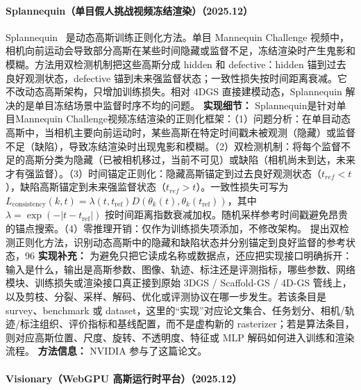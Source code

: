 \paragraph{Splannequin（单目假人挑战视频冻结渲染）（2025.12）}
Splannequin~\cite{2512_05113} 是动态高斯训练正则化方法。单目 Mannequin Challenge 视频中，相机向前运动会导致部分高斯在某些时间隐藏或监督不足，冻结渲染时产生鬼影和模糊。方法用双检测机制把这些高斯分成 hidden 和 defective：hidden 锚到过去良好观测状态，defective 锚到未来强监督状态；一致性损失按时间距离衰减。它不改动态高斯架构，只增加训练损失。相对 4DGS 直接建模动态，Splannequin 解决的是单目冻结场景中监督时序不均的问题。
\textbf{实现细节：} Splannequin是针对单目Mannequin Challenge视频冻结渲染的正则化框架：（1）问题分析：在单目动态高斯中，当相机主要向前运动时，某些高斯在特定时间戳未被观测（隐藏）或监督不足（缺陷），导致冻结渲染时出现鬼影和模糊。（2）双检测机制：将每个监督不足的高斯分类为隐藏（已被相机移过，当前不可见）或缺陷（相机尚未到达，未来才有强监督）。（3）时间锚定正则化：隐藏高斯锚定到过去良好观测状态（$t_{ref}<t$），缺陷高斯锚定到未来强监督状态（$t_{ref}>t$）。一致性损失可写为 $L_{\mathrm{consistency}}(k,t)=\lambda(t,t_{\mathrm{ref}})D(\theta_k(t),\theta_k(t_{\mathrm{ref}}))$，其中 $\lambda=\exp(-|t-t_{\mathrm{ref}}|)$ 按时间距离指数衰减加权。随机采样参考时间戳避免昂贵的锚点搜索。（4）零推理开销：仅作为训练损失项添加，不修改架构。 提出双检测正则化方法，识别动态高斯中的隐藏和缺陷状态并分别锚定到良好监督的参考状态，96
\textbf{实现补充：} 为避免只把它读成名称或数据点，还应把实现接口明确拆开：输入是什么，输出是高斯参数、图像、轨迹、标注还是评测指标，哪些参数、网络模块、训练损失或渲染接口真正接到原始 3DGS / Scaffold-GS / 4D-GS 管线上，以及剪枝、分裂、采样、解码、优化或评测协议在哪一步发生。若该条目是survey、benchmark 或 dataset，这里的“实现”对应论文集合、任务划分、相机/轨迹/标注组织、评价指标和基线配置，而不是虚构新的 rasterizer；若是算法条目，则对应高斯位置、尺度、旋转、不透明度、特征或 MLP 解码如何进入训练和渲染流程。
\textbf{方法信息：} NVIDIA 参与了这篇论文。



\paragraph{Visionary（WebGPU 高斯运行时平台）（2025.12）}


